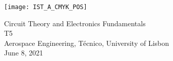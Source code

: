 
\thispagestyle {empty}

\texttt{[image: IST\_A\_CMYK\_POS]}

\begin{center}
%
\vspace{1.0cm}

\vspace{1cm}
{\FontLb Circuit Theory and Electronics Fundamentals} \\ %
\vspace{1cm}
{\FontLb T5} \\
\vspace{1cm}
{\FontSn Aerospace Engineering, Técnico, University of Lisbon} \\ %
\vspace{1cm}
{\FontSn June 8, 2021} \\ %
%
\end{center}

